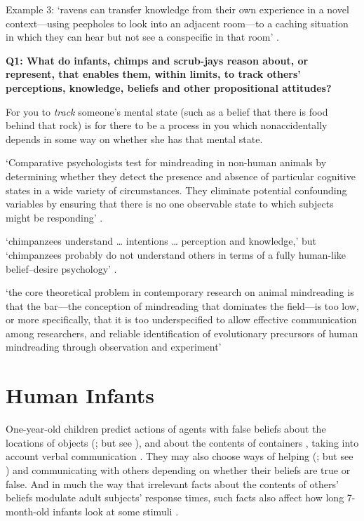 \documentclass[12pt]{extarticle}
\begin{document}
\begin{multicols*}{3}
Example 3: ‘ravens can transfer knowledge from their own experience in a novel context---using peepholes to look
into an adjacent room---to a caching situation in which they can hear but not see a conspecific in that
room’ \citep{bugnyar:2016_ravens}.

\textbf{Q1: What do infants, chimps and scrub-jays reason about, or represent, that enables them, within limits, to track others’ perceptions, knowledge, beliefs and other propositional attitudes?}

For you to \emph{track} someone’s mental state (such as a belief that there is food behind that rock)
is for there to be a process in you which nonaccidentally depends in some way on whether she has that
mental state.

‘Comparative psychologists test for mindreading in non-human animals by determining whether they
detect the presence and absence of particular cognitive states in a wide variety of
circumstances.
They eliminate potential confounding variables by ensuring that there is no one
observable state to which subjects might be responding’
\citep[p.~487]{halina:2015_there}.

‘chimpanzees understand … intentions … perception and knowledge,’ but ‘chimpanzees probably do not
understand others in terms of a fully human-like belief–desire psychology’
\citet[p.~191]{Call:2008di}.

‘the core theoretical problem in contemporary research on animal mindreading is that the bar—the
conception of mindreading that dominates the field—is too low, or more specifically, that it is
too underspecified to allow effective communication among researchers, and reliable
identification of evolutionary precursors of human mindreading through observation and experiment’
\citep[p.~318]{heyes:2014_animal}


\section{Human Infants}

One-year-old children predict actions of agents with false beliefs about the
locations of objects (\citealp{Clements:1994cw,Onishi:2005hm,Southgate:2007js}; but see \citealp{kulke:2017_replication}),
and about the contents of containers \citep{he:2011_false}, taking into
account verbal communication \citep{Song:2008qo,scott:2012_verbal_fb}.
They
may also choose ways of helping (\citealp[]{Buttelmann:2009gy}; but see \citealp{crivello:2017_infants}) and
communicating \citep{Knudsen:2011fk,southgate:2010fb} with others depending on
whether their beliefs are true or false. And in much the way that irrelevant
facts about the contents of others’ beliefs modulate adult subjects’ response
times, such facts also affect how long 7-month-old infants look at some
stimuli \citep[]{kovacs_social_2010}.


\end{multicols*}
\end{document}
